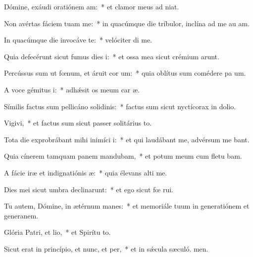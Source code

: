 \item Dómine, exáudi oratiónem am:~* et clamor meus ad  niat.
\item Non avértas fáciem tuam  me:~* in quacúmque die tríbulor, inclína ad me au am.
\item In quacúmque die invocáve te:~* velóciter di me.
\item Quia defecérunt sicut fumus dies i:~* et ossa mea sicut crémium arunt.
\item Percússus sum ut fœnum, et áruit cor um:~* quia oblítus sum comédere pa um.
\item A voce gémitus i:~* adhǽsit os meum car æ.
\item Símilis factus sum pellicáno solidinis:~* factus sum sicut nyctícorax in dolio.
\item Vigivi,~* et factus sum sicut passer solitárius  to.
\item Tota die exprobrábant mihi inimíci i:~* et qui laudábant me, advérsum me bant.
\item Quia cínerem tamquam panem mandubam,~* et potum meum cum fletu bam.
\item A fácie iræ et indignatiónis æ:~* quia élevans alti me.
\item Dies mei sicut umbra declinarunt:~* et ego sicut fœ rui.
\item Tu autem, Dómine, in ætérnum manes:~* et memoriále tuum in generatiónem et generanem.
\item Glória Patri, et lio,~* et Spirítu to.
\item Sicut erat in princípio, et nunc, et per,~* et in sǽcula sæculó. men.
